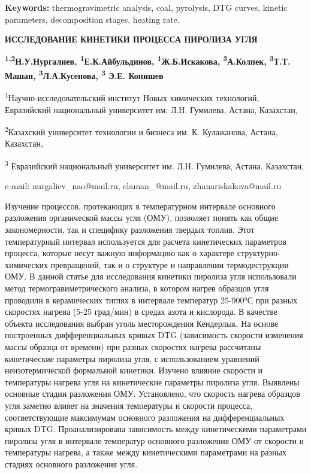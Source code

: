 {\bfseries Keywords:} thermogravimetric analysis, coal, pyrolysis, DTG
curves, kinetic parameters, decomposition stages, heating rate.

\begin{center}
{\large\bfseries ИССЛЕДОВАНИЕ КИНЕТИКИ ПРОЦЕССА ПИРОЛИЗА УГЛЯ}

{\bfseries \textsuperscript{1,2}Н.У.Нургалиев\envelope, \textsuperscript{1}Е.К.Айбульдинов\envelope, \textsuperscript{1}Ж.Б.Искакова\envelope, \textsuperscript{3}А.Колпек, \textsuperscript{3}Т.Т. Машан, \textsuperscript{3}Л.А.Кусепова, \textsuperscript{3} Э.Е. Копишев}

\textsuperscript{1}Научно-исследовательский институт Новых химических
технологий, Евразийский национальный университет им. Л.Н. Гумилева,
Астана, Казахстан,

\textsuperscript{2}Казахский университет технологии и бизнеса им. К.
Кулажанова, Астана, Казахстан,

\textsuperscript{3} Евразийский национальный университет им. Л.Н.
Гумилева, Астана, Казахстан,

e-mail: nurgaliev\_nao@mail.ru, elaman\_@mail.ru, zhanariskakova@mail.ru
\end{center}

Изучение процессов, протекающих в температурном интервале основного
разложения органической массы угля (ОМУ), позволяет понять как общие
закономерности, так и специфику разложения твердых топлив. Этот
температурный интервал используется для расчета кинетических параметров
процесса, которые несут важную информацию как о характере
структурно-химических превращений, так и о структуре и направлении
термодеструкции ОМУ. В данной статье для исследования кинетики пиролиза
угля использовали метод термогравиметрического анализа, в котором нагрев
образцов угля проводили в керамических тиглях в интервале температур
25-900°С при разных скоростях нагрева (5-25 град/мин) в средах азота и
кислорода. В качестве объекта исследования выбран уголь месторождения
Кендерлык. На основе построенных дифференциальных кривых DTG
(зависимость скорости изменения массы образца от времени) при разных
скоростях нагрева рассчитаны кинетические параметры пиролиза угля, с
использованием уравнений неизотермической формальной кинетики. Изучено
влияние скорости и температуры нагрева угля на кинетические параметры
пиролиза угля. Выявлены основные стадии разложения ОМУ. Установлено, что
скорость нагрева образцов угля заметно влияет на значения температуры и
скорости процесса, соответствующие максимумам основного разложения на
дифференциальных кривых DTG. Проанализирована зависимость между
кинетическими параметрами пиролиза угля в интервале температур основного
разложения ОМУ от скорости и температуры нагрева, а также между
кинетическими параметрами на разных стадиях основного разложения угля.

